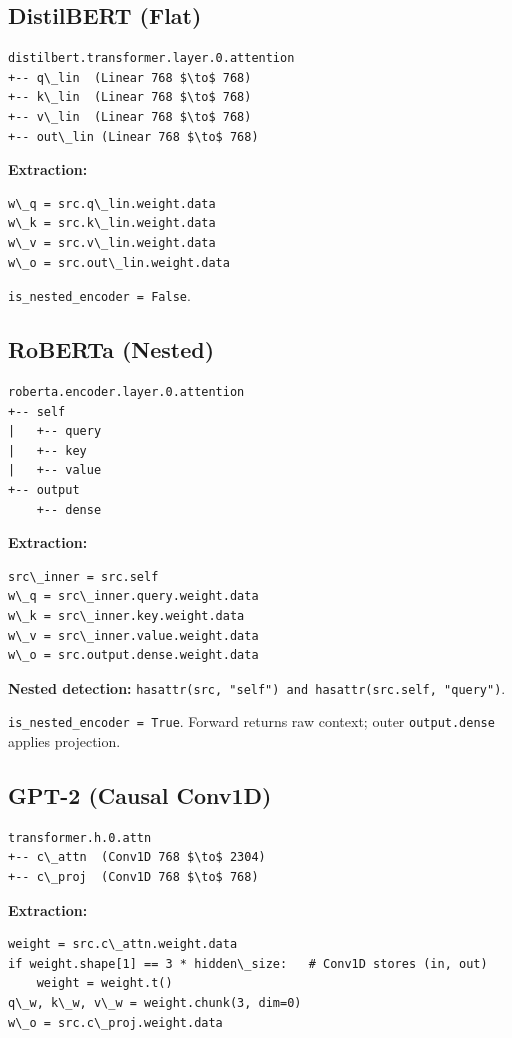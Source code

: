 \subsection{DistilBERT (Flat)}

\begin{lstlisting}
distilbert.transformer.layer.0.attention
+-- q\_lin  (Linear 768 $\to$ 768)
+-- k\_lin  (Linear 768 $\to$ 768)
+-- v\_lin  (Linear 768 $\to$ 768)
+-- out\_lin (Linear 768 $\to$ 768)
\end{lstlisting}

\textbf{Extraction:}
\begin{lstlisting}
w\_q = src.q\_lin.weight.data
w\_k = src.k\_lin.weight.data
w\_v = src.v\_lin.weight.data
w\_o = src.out\_lin.weight.data
\end{lstlisting}

\texttt{is\_nested\_encoder = False}.

\subsection{RoBERTa (Nested)}

\begin{lstlisting}
roberta.encoder.layer.0.attention
+-- self
|   +-- query
|   +-- key
|   +-- value
+-- output
    +-- dense
\end{lstlisting}

\textbf{Extraction:}
\begin{lstlisting}
src\_inner = src.self
w\_q = src\_inner.query.weight.data
w\_k = src\_inner.key.weight.data
w\_v = src\_inner.value.weight.data
w\_o = src.output.dense.weight.data
\end{lstlisting}

\textbf{Nested detection:} \texttt{hasattr(src, "self") and hasattr(src.self, "query")}.

\texttt{is\_nested\_encoder = True}. Forward returns raw context; outer 
\texttt{output.dense} applies projection.

\subsection{GPT-2 (Causal Conv1D)}

\begin{lstlisting}
transformer.h.0.attn
+-- c\_attn  (Conv1D 768 $\to$ 2304)
+-- c\_proj  (Conv1D 768 $\to$ 768)
\end{lstlisting}

\textbf{Extraction:}
\begin{lstlisting}
weight = src.c\_attn.weight.data
if weight.shape[1] == 3 * hidden\_size:   # Conv1D stores (in, out)
    weight = weight.t()
q\_w, k\_w, v\_w = weight.chunk(3, dim=0)
w\_o = src.c\_proj.weight.data
\end{lstlisting}

